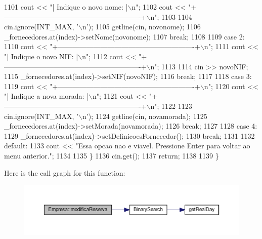 \begin{DoxyCode}
1101         cout << \textcolor{stringliteral}{"| Indique o novo nome:                                     |\(\backslash\)n"};
1102         cout << \textcolor{stringliteral}{"+----------------------------------------------------------+\(\backslash\)n"};
1103 
1104         cin.ignore(INT\_MAX, \textcolor{charliteral}{'\(\backslash\)n'});
1105         getline(cin, novonome);
1106         \_fornecedores.at(index)->setNome(novonome);
1107         \textcolor{keywordflow}{break};
1108 
1109     \textcolor{keywordflow}{case} 2:
1110         cout << \textcolor{stringliteral}{"+----------------------------------------------------------+\(\backslash\)n"};
1111         cout << \textcolor{stringliteral}{"| Indique o novo NIF:                                      |\(\backslash\)n"};
1112         cout << \textcolor{stringliteral}{"+----------------------------------------------------------+\(\backslash\)n"};
1113 
1114         cin >> novoNIF;
1115         \_fornecedores.at(index)->setNIF(novoNIF);
1116         \textcolor{keywordflow}{break};
1117 
1118     \textcolor{keywordflow}{case} 3:
1119         cout << \textcolor{stringliteral}{"+----------------------------------------------------------+\(\backslash\)n"};
1120         cout << \textcolor{stringliteral}{"| Indique a nova morada:                                   |\(\backslash\)n"};
1121         cout << \textcolor{stringliteral}{"+----------------------------------------------------------+\(\backslash\)n"};
1122 
1123         cin.ignore(INT\_MAX, \textcolor{charliteral}{'\(\backslash\)n'});
1124         getline(cin, novamorada);
1125         \_fornecedores.at(index)->setMorada(novamorada);
1126         \textcolor{keywordflow}{break};
1127 
1128     \textcolor{keywordflow}{case} 4:
1129         \_fornecedores.at(index)->setDefinicoesFornecedor();
1130         \textcolor{keywordflow}{break};
1131 
1132     \textcolor{keywordflow}{default}:
1133         cout << \textcolor{stringliteral}{"Essa opcao nao e viavel. Pressione Enter para voltar ao menu anterior."};
1134 
1135     \}
1136     cin.get();
1137     \textcolor{keywordflow}{return};
1138 
1139 \}
\end{DoxyCode}


Here is the call graph for this function\+:
\nopagebreak
\begin{figure}[H]
\begin{center}
\leavevmode
\includegraphics[width=350pt]{classEmpresa_ae74f80c120a14f0591d04fe7603e6905_cgraph}
\end{center}
\end{figure}


